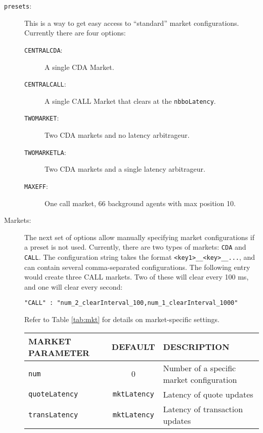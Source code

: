 \documentclass[11pt]{article}
\begin{document}
\begin{description}

\item[\texttt{presets}:] This is a way to get easy access to ``standard'' market
  configurations. Currently there are four options:
  \begin{description}
  \item[\texttt{CENTRALCDA}:] A single CDA Market.
  \item[\texttt{CENTRALCALL}:] A single CALL Market that clears at the \texttt{nbboLatency}.
  \item[\texttt{TWOMARKET}:] Two CDA markets and no latency arbitrageur.
  \item[\texttt{TWOMARKETLA}:] Two CDA markets and a single latency arbitrageur.
  \item[\texttt{MAXEFF}:] One call market, 66 background agents with max position 10.
  \end{description}
  
\item[Markets:] The next set of options allow manually specifying market configurations
  if a preset is not used. Currently, there are two types of markets: \texttt{CDA} and \texttt{CALL}. The configuration string takes the format
  \texttt{<key1>\_<value1>\_<key>\_<value2>\_...}, and can contain several comma-separated configurations. The following entry would create three CALL
  markets. Two of these will clear every 100 ms, and one will clear every
  second:

\begin{verbatim}
"CALL" : "num_2_clearInterval_100,num_1_clearInterval_1000"
\end{verbatim}

Refer to Table \ref{tab:mkt} for details on market-specific settings.

\begin{table}
\centering
\begin{tabular}[f]{p{} c p{}}
\uppercase{Market parameter}   & \uppercase{Default} & \uppercase{Description} \\ \hline

\verb|num|			& 0	& Number of a specific market configuration \\

\verb|quoteLatency|			& \verb|mktLatency| & Latency of quote updates \\
\verb|transLatency|	& \verb|mktLatency| & Latency of transaction updates \\


\end{tabular}
\end{table}
\end{description}
\end{document}

